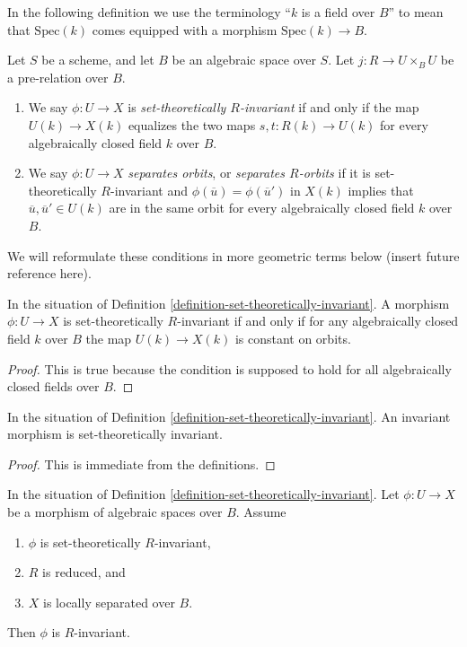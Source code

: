 \noindent
In the following definition we use the terminology ``$k$ is a field
over $B$'' to mean that $\text{Spec}(k)$ comes equipped with a morphism
$\text{Spec}(k) \to B$.

\begin{definition}
\label{definition-set-theoretically-invariant}
Let $S$ be a scheme, and let $B$ be an algebraic space over $S$.
Let $j : R \to U \times_B U$ be a pre-relation over $B$.
\begin{enumerate}
\item We say $\phi : U \to X$ is {\it set-theoretically $R$-invariant}
if and only if the map $U(k) \to X(k)$ equalizes the two maps
$s, t : R(k) \to U(k)$ for every algebraically closed field $k$
over $B$.
\item We say $\phi : U \to X$ {\it separates orbits}, or
{\it separates $R$-orbits} if it is set-theoretically $R$-invariant and
$\phi(\overline{u}) = \phi(\overline{u}')$ in $X(k)$ implies that
$\overline{u}, \overline{u}' \in U(k)$ are in the same orbit
for every algebraically closed field $k$ over $B$.
\end{enumerate}
\end{definition}

\noindent
We will reformulate these conditions in more geometric terms below
(insert future reference here).

\begin{lemma}
\label{lemma-set-theoretic-invariant}
In the situation of Definition \ref{definition-set-theoretically-invariant}.
A morphism $\phi : U \to X$ is set-theoretically $R$-invariant if and
only if for any algebraically closed field $k$ over $B$ the map
$U(k) \to X(k)$ is constant on orbits.
\end{lemma}

\begin{proof}
This is true because the condition is supposed to hold for all algebraically
closed fields over $B$.
\end{proof}

\begin{lemma}
\label{lemma-invariant-set-theoretically-invariant}
In the situation of Definition \ref{definition-set-theoretically-invariant}.
An invariant morphism is set-theoretically invariant.
\end{lemma}

\begin{proof}
This is immediate from the definitions.
\end{proof}

\begin{lemma}
\label{lemma-set-theoretically-invariant-invariant-when-reduced}
In the situation of Definition \ref{definition-set-theoretically-invariant}.
Let $\phi : U \to X$ be a morphism of algebraic spaces over $B$.
Assume
\begin{enumerate}
\item $\phi$ is set-theoretically $R$-invariant,
\item $R$ is reduced, and
\item $X$ is locally separated over $B$.
\end{enumerate}
Then $\phi$ is $R$-invariant.
\end{lemma}

